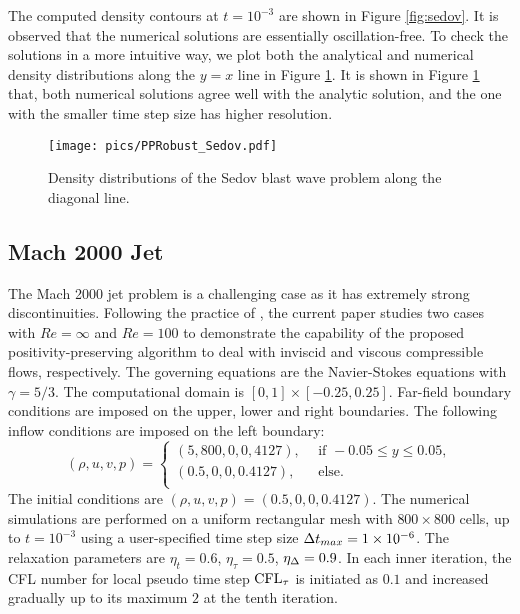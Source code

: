 The computed density contours at $t=10^{-3}$ are shown in Figure \ref{fig:sedov}. It is observed that the numerical solutions are essentially oscillation-free. To check the solutions in a more intuitive way, we plot both the analytical and numerical density distributions along the $y=x$ line in Figure \ref{fig:sedovLine}.
It is shown in Figure \ref{fig:sedovLine} that, both numerical solutions agree well with the analytic solution,
and the one with the smaller time step size has higher resolution.

\begin{figure}[htbp]
    \centering
    \texttt{[image: pics/PPRobust\_Sedov.pdf]}
    \caption{Density distributions of the Sedov blast wave problem along the diagonal line.}
    \label{fig:sedovLine}
\end{figure}






\subsection{Mach 2000 Jet}

The Mach 2000 jet problem \cite{zhang2010positivity} is a challenging case as it has extremely strong discontinuities.
Following the practice of \cite{huang2024general}, 
the current paper studies two cases with $Re=\infty$ and $Re=100$ to demonstrate the capability of the proposed positivity-preserving algorithm to deal with inviscid and viscous compressible flows, respectively.
The governing equations are the Navier-Stokes equations with $\gamma=5/3$.
The computational domain is $[0,1]\times[-0.25,0.25]$.
Far-field boundary conditions are imposed on the upper, lower and right boundaries. The following inflow conditions are imposed on the left boundary:
\begin{equation}
    (\rho,u,v,p) = \left\{
        \begin{array}{ll}
            (5,800,0,0,4127),\ \ & \text{if } -0.05 \leq y \leq 0.05, \\
            (0.5,0,0,0.4127),\ \ & \text{else}.\\
        \end{array}
    \right.
\end{equation}
The initial conditions are $(\rho,u,v,p)=(0.5,0,0,0.4127)$.
The numerical simulations are performed on a uniform rectangular mesh with $800 \times 800$ cells, up to $t=10^{-3}$ using a user-specified time step size $\mathrm\Delta t_{max} = 1\times10^{-6}$. 
The relaxation parameters are  $\eta_t= 0.6$, $\eta_\tau=0.5$, $\eta_\mathrm\Delta=0.9$.
In each inner iteration, the CFL number for local pseudo time step $\text{CFL}_\tau$ is initiated as $0.1$ and increased gradually up to its maximum $2$ at the tenth iteration. 

